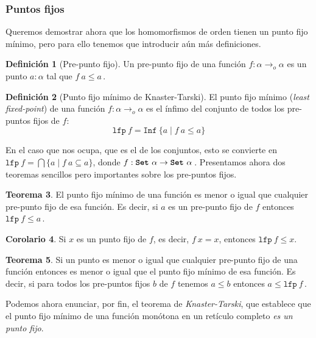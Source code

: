 \documentclass[
  a4paper, 
  10pt, 
  parskip=half, 
  toc=bibliography,
]{scrbook}
\theoremstyle{definition}
\theoremstyle{bolddef}
\newtheorem{theorem}{Teorema}[section]
\newtheorem{corollary}[theorem]{Corolario}
\newtheorem{definition}[theorem]{Definición}
\newcommand{\funfont}[1]{\texttt{#1}}
\newcommand{\tyfont}[1]{\texttt{\textbf{#1}}}
\begin{document}
\subsubsection{Puntos fijos}

Queremos demostrar ahora que los homomorfismos de orden tienen un punto fijo mínimo,
pero para ello tenemos que introducir aún más definiciones.

\begin{definition}[Pre-punto fijo]
  Un pre-punto fijo de una función \(f: \alpha \to_o \alpha\) es un punto \(a: \alpha\)
  tal que \(f \ a \leq a\,\).
\end{definition}

\begin{definition}[Punto fijo mínimo de Knaster-Tarski]
  El punto fijo mínimo (\emph{least fixed-point}) de una función \(f: \alpha \to_o \alpha\) es el ínfimo del
  conjunto de todos los pre-puntos fijos de \(f\):
  \[
    \funfont{lfp} \ f = \funfont{Inf} \ \{a \mid f \ a \leq a\}
  \]
\end{definition}

En el caso que nos ocupa, que es el de los conjuntos, esto se convierte en
\(\funfont{lfp} \ f = \bigcap \{a \mid f \ a \subseteq a\}\),
donde \(f: \tyfont{Set} \ \alpha \to \tyfont{Set} \ \alpha\,\).
Presentamos ahora dos teoremas sencillos pero importantes sobre los pre-puntos fijos.

\begin{theorem}
  El punto fijo mínimo de una función es menor o igual que cualquier
  pre-punto fijo de esa función. Es decir, si \(a\) es un pre-punto fijo
  de \(f\) entonces \(\funfont{lfp} \ f \leq a\,\).
\end{theorem}

\begin{corollary}
  Si \(x\) es un punto fijo de \(f\), es decir, \(f \ x = x\), entonces
  \(\funfont{lfp} \ f \leq x\).
\end{corollary}

\begin{theorem}\label{thm:lfp_le}
  Si un punto es menor o igual que cualquier pre-punto fijo de una función
  entonces es menor o igual que el punto fijo mínimo de esa función.
  Es decir, si para todos los pre-puntos fijos \(b\) de \(f\) tenemos
  \(a \leq b\) entonces \(a \leq \funfont{lfp} \ f\,\).
\end{theorem}

Podemos ahora enunciar, por fin, el teorema de \emph{Knaster-Tarski}, que establece que
el punto fijo mínimo de una función monótona en un retículo completo 
\emph{es un punto fijo}.
\end{document}
